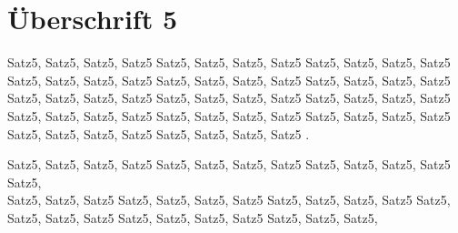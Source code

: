 
\section{Überschrift 5}

Satz5, Satz5, Satz5, Satz5 Satz5, Satz5, Satz5, Satz5 Satz5, Satz5, Satz5, Satz5 Satz5, Satz5, Satz5, Satz5 Satz5, Satz5, Satz5, Satz5 
Satz5, Satz5, Satz5, Satz5 Satz5, Satz5, Satz5, Satz5 Satz5, Satz5, Satz5, Satz5 Satz5, Satz5, Satz5, Satz5 Satz5, Satz5, Satz5, Satz5 
Satz5, Satz5, Satz5, Satz5 Satz5, Satz5, Satz5, Satz5 Satz5, Satz5, Satz5, Satz5 Satz5, Satz5, Satz5, Satz5 .


Satz5, Satz5, Satz5, Satz5 Satz5, Satz5, Satz5, Satz5 Satz5, Satz5, Satz5, Satz5 Satz5, \\
Satz5, Satz5, Satz5 Satz5, Satz5, Satz5, Satz5 
Satz5, Satz5, Satz5, Satz5 Satz5, Satz5, Satz5, Satz5 Satz5, Satz5, Satz5, Satz5 Satz5, Satz5, Satz5,